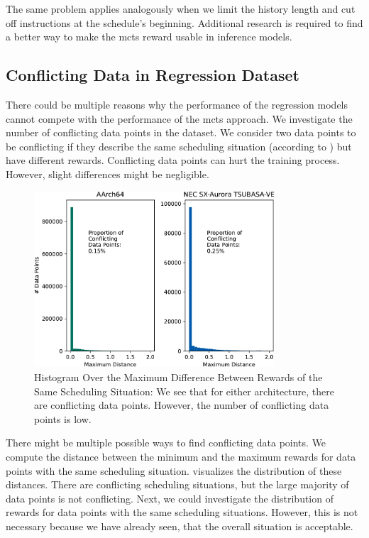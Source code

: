 The same problem applies analogously when we limit the history length and cut off instructions at the schedule's beginning.
Additional research is required to find a better way to make the \ac{mcts} reward usable in inference models.

\subsection{Conflicting Data in Regression Dataset}
There could be multiple reasons why the performance of the regression models cannot compete with the performance of the \ac{mcts} approach.
We investigate the number of conflicting data points in the dataset.
We consider two data points to be conflicting if they describe the same scheduling situation (according to ) but have different rewards.
Conflicting data points can hurt the training process.
However, slight differences might be negligible.

\begin{figure}
    \centering
    \includegraphics[width=0.8\textwidth]{img/hist-regr-conflicts-crop.pdf}
    \caption[Histogram Over the Maximum Difference Between Rewards of the Same Scheduling Situation]{Histogram Over the Maximum Difference Between Rewards of the Same Scheduling Situation:
    We see that for either architecture, there are conflicting data points.
    However, the number of conflicting data points is low.}
    \label{fig:eval:hist-conflicting-data-points}
\end{figure}
There might be multiple possible ways to find conflicting data points.
We compute the distance between the minimum and the maximum rewards for data points with the same scheduling situation.
 visualizes the distribution of these distances.
There are conflicting scheduling situations, but the large majority of data points is not conflicting.
Next, we could investigate the distribution of rewards for data points with the same scheduling situations.
However, this is not necessary because we have already seen, that the overall situation is acceptable.

